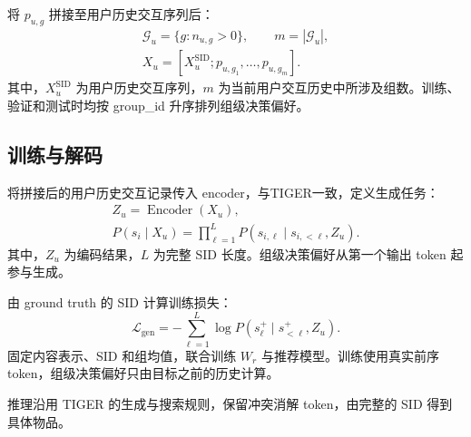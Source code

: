 \documentclass[UTF8,11pt,a4paper]{ctexart}
\begin{document}
将 $p_{u,g}$ 拼接至用户历史交互序列后：
\begin{gather}
 \mathcal G_u=\{g:n_{u,g}>0\},\qquad m=|\mathcal G_u|,\\
 X_u=[X_u^{\mathrm{SID}};p_{u,g_1},\ldots,p_{u,g_m}].
\end{gather}
其中，$X_u^{\mathrm{SID}}$ 为用户历史交互序列，$m$ 为当前用户交互历史中所涉及组数。训练、验证和测试时均按 group\_id 升序排列组级决策偏好。

\subsection{训练与解码}

将拼接后的用户历史交互记录传入 encoder，与TIGER一致，定义生成任务：
\begin{gather}
 Z_u=\operatorname{Encoder}(X_u),\\
 P(s_i\mid X_u)=\prod_{\ell=1}^{L}
 P(s_{i,\ell}\mid s_{i,<\ell},Z_u).
\end{gather}
其中，$Z_u$ 为编码结果，$L$ 为完整 SID 长度。组级决策偏好从第一个输出 token 起参与生成。

由 ground truth 的 SID 计算训练损失：
\begin{equation}
 \mathcal L_{\mathrm{gen}}=-\sum_{\ell=1}^{L}
 \log P(s^+_\ell\mid s^+_{<\ell},Z_u).
\end{equation}
固定内容表示、SID 和组均值，联合训练 $W_r$ 与推荐模型。训练使用真实前序 token，组级决策偏好只由目标之前的历史计算。

推理沿用 TIGER 的生成与搜索规则，保留冲突消解 token，由完整的 SID 得到具体物品。
\end{document}
